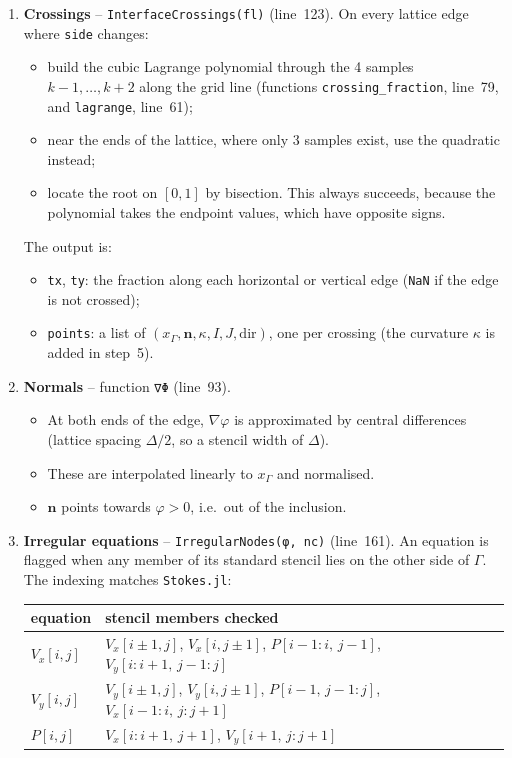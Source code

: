 \documentclass[11pt,a4paper]{article}
\newcommand{\code}[1]{\texttt{#1}}
\begin{document}
\begin{enumerate}[leftmargin=*]
\item \textbf{Crossings} -- \code{InterfaceCrossings(fl)} (line~123).
  On every lattice edge where \code{side} changes:
  \begin{itemize}
    \item build the cubic Lagrange polynomial through the 4 samples $k-1,\dots,k+2$ along the
      grid line (functions \code{crossing\_fraction}, line~79, and \code{lagrange}, line~61);
    \item near the ends of the lattice, where only 3 samples exist, use the quadratic instead;
    \item locate the root on $[0,1]$ by bisection. This always succeeds, because the
      polynomial takes the endpoint values, which have opposite signs.
  \end{itemize}
  The output is:
  \begin{itemize}
    \item \code{tx}, \code{ty}: the fraction along each horizontal or vertical edge
      (\code{NaN} if the edge is not crossed);
    \item \code{points}: a list of $(x_\Gamma,\mathbf n,\kappa,I,J,\text{dir})$, one per crossing (the curvature $\kappa$ is added in step~5).
  \end{itemize}

\item \textbf{Normals} -- function \code{∇Φ} (line~93).
  \begin{itemize}
    \item At both ends of the edge, $\nabla\varphi$ is approximated by central differences
      (lattice spacing $\Delta/2$, so a stencil width of $\Delta$).
    \item These are interpolated linearly to $x_\Gamma$ and normalised.
    \item $\mathbf n$ points towards $\varphi>0$, i.e.\ out of the inclusion.
  \end{itemize}

\item \textbf{Irregular equations} -- \code{IrregularNodes(φ, nc)} (line~161).
  An equation is flagged when any member of its standard stencil lies on the other side of
  $\Gamma$. The indexing matches \code{Stokes.jl}:
  \begin{center}
  \begin{tabular}{@{}ll@{}}
    \toprule
    equation & stencil members checked \\
    \midrule
    $V_x[i,j]$ & $V_x[i\pm1,j]$, $V_x[i,j\pm1]$, $P[i-1{:}i,\,j-1]$, $V_y[i{:}i+1,\,j-1{:}j]$ \\
    $V_y[i,j]$ & $V_y[i\pm1,j]$, $V_y[i,j\pm1]$, $P[i-1,\,j-1{:}j]$, $V_x[i-1{:}i,\,j{:}j+1]$ \\
    $P[i,j]$ & $V_x[i{:}i+1,\,j+1]$, $V_y[i+1,\,j{:}j+1]$ \\
    \bottomrule
  \end{tabular}
  \end{center}


\end{enumerate}
\end{document}
